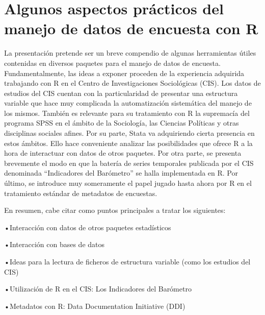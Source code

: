 \chapter{Algunos aspectos prácticos del manejo de datos de encuesta con R}




La presentación pretende ser un breve compendio de algunas herramientas útiles contenidas en diversos paquetes para el manejo de datos de encuesta. Fundamentalmente, las ideas a exponer proceden de la experiencia adquirida trabajando con R en el Centro de Investigaciones Sociológicas (CIS). Los datos de estudios del CIS cuentan con la particularidad de presentar una estructura variable que hace muy complicada la automatización sistemática del manejo de los mismos. También es relevante para su tratamiento con R la supremacía del programa SPSS en el ámbito de la Sociología, las Ciencias Políticas y otras disciplinas sociales afines. Por su parte, Stata va adquiriendo cierta presencia en estos ámbitos. Ello hace conveniente analizar las posibilidades que ofrece R a la hora de interactuar con datos de otros paquetes. Por otra parte, se presenta brevemente el modo en que la batería de series temporales publicada por el CIS denominada “Indicadores del Barómetro” se halla implementada en R. Por último, se introduce muy someramente el papel jugado hasta ahora por R en el tratamiento estándar de metadatos de encuestas.

En resumen, cabe citar como puntos principales a tratar los siguientes:

•Interacción con datos de otros paquetes estadísticos

•Interacción con bases de datos

•Ideas para la lectura de ficheros de estructura variable (como los estudios del CIS)

•Utilización de R en el CIS: Los Indicadores del Barómetro

•Metadatos con R: Data Documentation Initiative (DDI)

%

%
